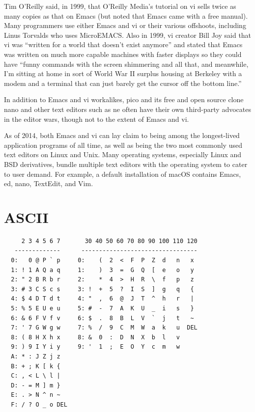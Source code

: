 \documentclass[10pt,twoside,openright]{memoir}
\begin{document}
Tim O'Reilly said, in 1999, that O'Reilly Media's tutorial on vi sells twice as many copies as that on Emacs (but noted that Emacs came with a free manual). Many programmers use either Emacs and vi or their various offshoots, including Linus Torvalds who uses MicroEMACS. Also in 1999, vi creator Bill Joy said that vi was ``written for a world that doesn't exist anymore'' and stated that Emacs was written on much more capable machines with faster displays so they could have ``funny commands with the screen shimmering and all that, and meanwhile, I'm sitting at home in sort of World War II surplus housing at Berkeley with a modem and a terminal that can just barely get the cursor off the bottom line.''

In addition to Emacs and vi workalikes, pico and its free and open source clone nano and other text editors such as ne often have their own third-party advocates in the editor wars, though not to the extent of Emacs and vi.

As of 2014, both Emacs and vi can lay claim to being among the longest-lived application programs of all time, as well as being the two most commonly used text editors on Linux and Unix. Many operating systems, especially Linux and BSD derivatives, bundle multiple text editors with the operating system to cater to user demand. For example, a default installation of macOS contains Emacs, ed, nano, TextEdit, and Vim.



\chapter{ASCII}

{\footnotesize
\begin{verbatim}
     2 3 4 5 6 7       30 40 50 60 70 80 90 100 110 120
   -------------      ---------------------------------
  0:   0 @ P ` p     0:    (  2  <  F  P  Z  d   n   x
  1: ! 1 A Q a q     1:    )  3  =  G  Q  [  e   o   y
  2: " 2 B R b r     2:    *  4  >  H  R  \  f   p   z
  3: # 3 C S c s     3: !  +  5  ?  I  S  ]  g   q   {
  4: $ 4 D T d t     4: "  ,  6  @  J  T  ^  h   r   |
  5: % 5 E U e u     5: #  -  7  A  K  U  _  i   s   }
  6: & 6 F V f v     6: $  .  8  B  L  V  `  j   t   ~
  7: ' 7 G W g w     7: %  /  9  C  M  W  a  k   u  DEL
  8: ( 8 H X h x     8: &  0  :  D  N  X  b  l   v
  9: ) 9 I Y i y     9: '  1  ;  E  O  Y  c  m   w
  A: * : J Z j z
  B: + ; K [ k {
  C: , < L \ l |
  D: - = M ] m }
  E: . > N ^ n ~
  F: / ? O _ o DEL  
\end{verbatim}
}
\end{document}
